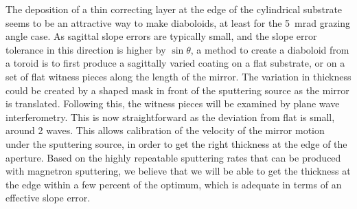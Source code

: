 \documentclass{iucr}       %
\begin{document}
The deposition of a thin correcting layer at the edge of the cylindrical substrate seems to be an attractive way to make diaboloids, at least for the \SI{5}{\milli\radian} grazing angle case. As sagittal slope errors are typically small, and the slope error tolerance in this direction is higher by $\sin\theta$, a method to create a diaboloid from a toroid is to first produce a sagittally varied coating on a flat substrate, or on a set of flat witness pieces along the length of the mirror. The variation in thickness could be created by a shaped mask in front of the sputtering source as the mirror is translated. Following this, the witness pieces will be examined by plane wave interferometry. This is now straightforward as the deviation from flat is small, around 2 waves. This allows calibration of the velocity of the mirror motion under the sputtering source, in order to get the right thickness at the edge of the aperture. Based on the highly repeatable sputtering rates that can be produced with magnetron sputtering, we believe that we will be able to get the thickness at the edge within a few percent of the optimum, which is adequate in terms of an effective slope error. 
\end{document}
